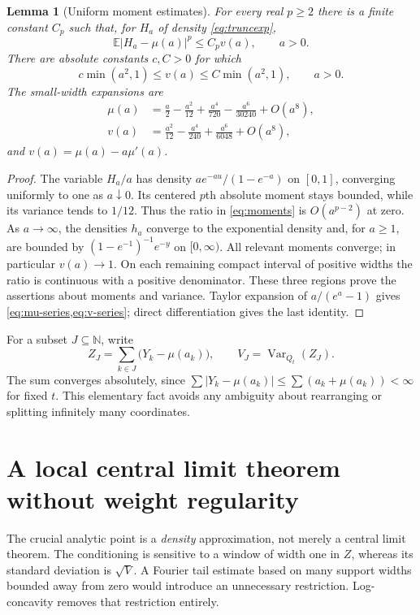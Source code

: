 \documentclass[11pt,a4paper]{article}
\numberwithin{equation}{section}
\newtheorem{lemma}[lemma]{Lemma}
\theoremstyle{definition}
\theoremstyle{remark}
\newcommand{\N}{\mathbb N}
\newcommand{\E}{\mathbb E}
\newcommand{\Qt}{Q_t}
\newcommand{\Var}{\operatorname{Var}}
\begin{document}
\begin{lemma}[Uniform moment estimates]\label{lem:moments}
For every real $p\ge2$ there is a finite constant $C_p$ such that,
for $H_a$ of density \cref{eq:truncexp},
\begin{equation}\label{eq:moments}
 \E|H_a-\mu(a)|^p\le C_pv(a),\qquad a>0.
\end{equation}
There are absolute constants $c,C>0$ for which
\[
 c\min(a^2,1)\le v(a)\le C\min(a^2,1),\qquad a>0.
\]
The small-width expansions are
\begin{align}
 \mu(a)&=\frac a2-\frac{a^2}{12}+\frac{a^4}{720}
               -\frac{a^6}{30240}+O(a^8),\label{eq:mu-series}\\
 v(a)&=\frac{a^2}{12}-\frac{a^4}{240}
               +\frac{a^6}{6048}+O(a^8),\label{eq:v-series}
\end{align}
and $v(a)=\mu(a)-a\mu'(a)$.
\end{lemma}
\begin{proof}
The variable $H_a/a$ has density
$a e^{-au}/(1-e^{-a})$ on $[0,1]$, converging uniformly to one as
$a\downarrow0$. Its centered $p$th absolute moment stays bounded,
while its variance tends to $1/12$. Thus the ratio in
\cref{eq:moments} is $O(a^{p-2})$ at zero.
As $a\to\infty$, the densities $h_a$ converge to the exponential
density and, for $a\ge1$, are bounded by
$(1-e^{-1})^{-1}e^{-y}$ on $[0,\infty)$. All relevant moments
converge; in particular $v(a)\to1$. On each remaining compact
interval of positive widths the ratio is continuous with a positive
denominator. These three regions prove the assertions about moments
and variance. Taylor expansion of $a/(e^a-1)$ gives
\cref{eq:mu-series,eq:v-series}; direct differentiation gives the last
identity.
\end{proof}

For a subset $J\subseteq\N$, write
\begin{equation}\label{eq:zJ}
 Z_J=\sum_{k\in J}\bigl(Y_k-\mu(a_k)\bigr),\qquad
 V_J=\Var_{\Qt}(Z_J).
\end{equation}
The sum converges absolutely, since
$\sum|Y_k-\mu(a_k)|\le\sum(a_k+\mu(a_k))<\infty$ for fixed $t$.
This elementary fact avoids any ambiguity about rearranging or
splitting infinitely many coordinates.

\section{A local central limit theorem without weight regularity}
\label{sec:lclt}
The crucial analytic point is a \emph{density} approximation, not
merely a central limit theorem. The conditioning is sensitive to a
window of width one in $Z$, whereas its standard deviation is
$\sqrt V$. A Fourier tail estimate based on many support widths
bounded away from zero would introduce an unnecessary restriction.
Log-concavity removes that restriction entirely.
\end{document}
